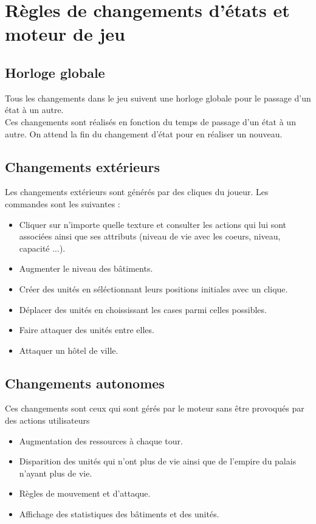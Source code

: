 \documentclass[12pt,a4paper]{article}
\begin{document}
\newpage
\section{Règles de changements d'états et moteur de jeu}

\subsection{Horloge globale}
Tous les changements dans le jeu suivent une horloge globale pour le passage d'un état à un autre. \\
Ces changements sont réalisés en fonction du temps de passage d'un état à un autre. On attend la fin du changement d'état pour en réaliser un nouveau.

\subsection{Changements extérieurs}
Les changements extérieurs sont générés par des cliques du joueur. Les commandes sont les suivantes : 
\begin{itemize}
\item Cliquer sur n'importe quelle texture et consulter les actions qui lui sont associées ainsi que ses attributs (niveau de vie avec les coeurs, niveau, capacité ...).
\item Augmenter le niveau des bâtiments.
\item Créer des unités en séléctionnant leurs positions initiales avec un clique.
\item Déplacer des unités en choississant les cases parmi celles possibles.
\item Faire attaquer des unités entre elles.
\item Attaquer un hôtel de ville.
\end{itemize}

\subsection{Changements autonomes}
Ces changements sont ceux qui sont gérés par le moteur sans être provoqués par des actions utilisateurs
\begin{itemize}
\item Augmentation des ressources à chaque tour.
\item Disparition des unités qui n'ont plus de vie ainsi que de l'empire du palais n'ayant plus de vie.
\item Règles de mouvement et d'attaque.
\item Affichage des statistiques des bâtiments et des unités.
\end{itemize}
\end{document}
